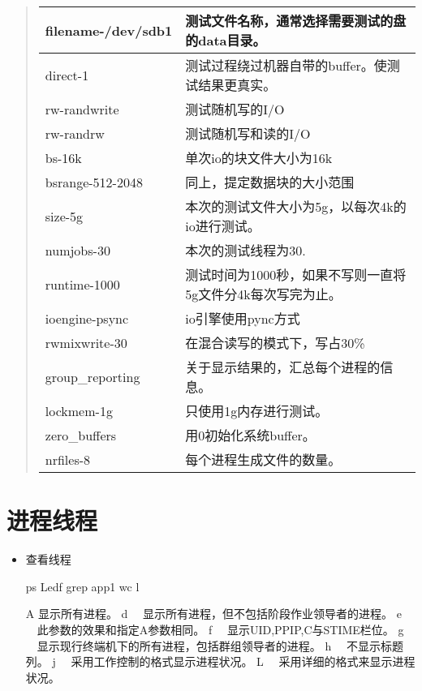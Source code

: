 \documentclass[a4paper,10pt,english]{sphinxmanual}
\begin{document}
\begin{quote}
\begin{savenotes}
\begin{tabulary}{\linewidth}[t]{|T|T|}
filename-/dev/sdb1
&
测试文件名称，通常选择需要测试的盘的data目录。
\\
\hline
direct-1
&
测试过程绕过机器自带的buffer。使测试结果更真实。
\\
\hline
rw-randwrite
&
测试随机写的I/O
\\
\hline
rw-randrw
&
测试随机写和读的I/O
\\
\hline
bs-16k
&
单次io的块文件大小为16k
\\
\hline
bsrange-512-2048
&
同上，提定数据块的大小范围
\\
\hline
size-5g
&
本次的测试文件大小为5g，以每次4k的io进行测试。
\\
\hline
numjobs-30
&
本次的测试线程为30.
\\
\hline
runtime-1000
&
测试时间为1000秒，如果不写则一直将5g文件分4k每次写完为止。
\\
\hline
ioengine-psync
&
io引擎使用pync方式
\\
\hline
rwmixwrite-30
&
在混合读写的模式下，写占30\%
\\
\hline
group\_reporting
&
关于显示结果的，汇总每个进程的信息。
\\
\hline
lockmem-1g
&
只使用1g内存进行测试。
\\
\hline
zero\_buffers
&
用0初始化系统buffer。
\\
\hline
nrfiles-8
&
每个进程生成文件的数量。
\\
\hline
\end{tabulary}
\par
\sphinxattableend\end{savenotes}
\end{quote}


\section{进程线程}
\label{\detokenize{linux/shell:id3}}\begin{itemize}
\item {} 
查看线程

\begin{sphinxVerbatim}[commandchars=\\\{\}]
ps \PYGZhy{}Ledf  grep app1  wc \PYGZhy{}l
\end{sphinxVerbatim}

\begin{sphinxVerbatim}[commandchars=\\\{\}]
\PYGZhy{}A   显示所有进程。
\PYGZhy{}d 　显示所有进程，但不包括阶段作业领导者的进程。
\PYGZhy{}e 　此参数的效果和指定\PYGZdq{}A\PYGZdq{}参数相同。
\PYGZhy{}f 　显示UID,PPIP,C与STIME栏位。
\PYGZhy{}g 　显示现行终端机下的所有进程，包括群组领导者的进程。
 h 　不显示标题列。
\PYGZhy{}j 　采用工作控制的格式显示进程状况。
\PYGZhy{}L 　采用详细的格式来显示进程状况。
\end{sphinxVerbatim}

\end{itemize}
\end{document}
